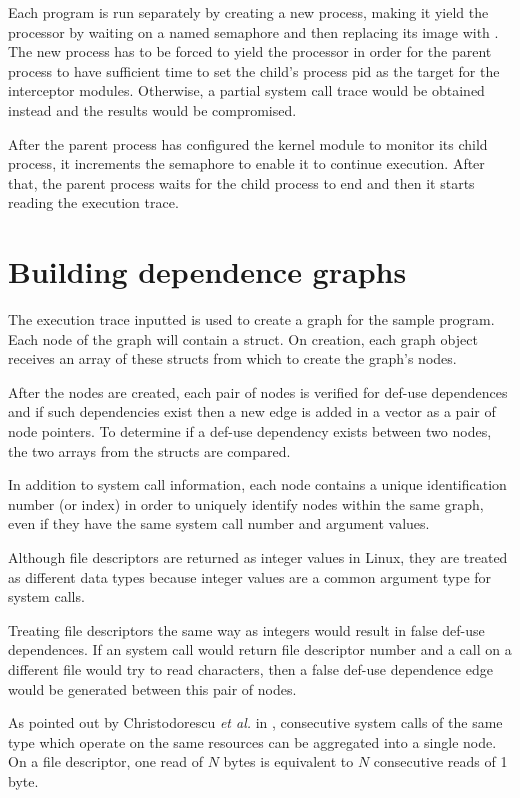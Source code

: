 Each program is run separately by creating a new process, making it yield the processor by waiting on a named semaphore and then replacing its image with . The new process has to be forced to yield the processor in order for the parent process to have sufficient time to set the child’s process pid as the target for the interceptor modules. Otherwise, a partial system call trace would be obtained instead and the results would be compromised. 

After the parent process has configured the kernel module to monitor its child process, it increments the semaphore to enable it to continue execution. After that, the parent process waits for the child process to end and then it starts reading the execution trace.

\section{Building dependence graphs}
\label{fourth:dep-graphs}

The execution trace inputted is used to create a graph for the sample program. Each node of the graph will contain a  struct. On creation, each graph object receives an array of these structs from which to create the graph’s nodes.

After the nodes are created, each pair of nodes is verified for def-use dependences and if such dependencies exist then a new edge is added in a vector as a pair of node pointers. To determine if a def-use dependency exists between two nodes, the two  arrays from the  structs are compared.

In addition to system call information, each node contains a unique identification number (or index) in order to uniquely identify nodes within the same graph, even if they have the same system call number and argument values.

Although file descriptors are returned as integer values in Linux, they are treated as different data types because integer values are a common argument type for system calls. 

Treating file descriptors the same way as integers would result in false def-use dependences. If an  system call would return file descriptor number  and a  call on a different file would try to read  characters, then a false def-use dependence edge would be generated between this pair of nodes.

As pointed out by Christodorescu \textit{et al.} in \cite{mining-specifications}, consecutive system calls of the same type which operate on the same resources can be aggregated into a single node. On a file descriptor, one read of $N$ bytes is equivalent to $N$ consecutive reads of 1 byte.

